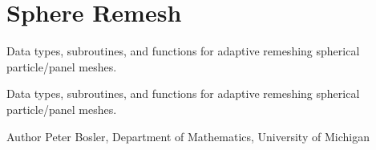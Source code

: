 \hypertarget{group___sphere_remesh}{\section{Sphere Remesh}
\label{group___sphere_remesh}
}


Data types, subroutines, and functions for adaptive remeshing spherical particle/panel meshes.  


Data types, subroutines, and functions for adaptive remeshing spherical particle/panel meshes. 

\begin{DoxyAuthor}{Author}
Peter Bosler, Department of Mathematics, University of Michigan 
\end{DoxyAuthor}

